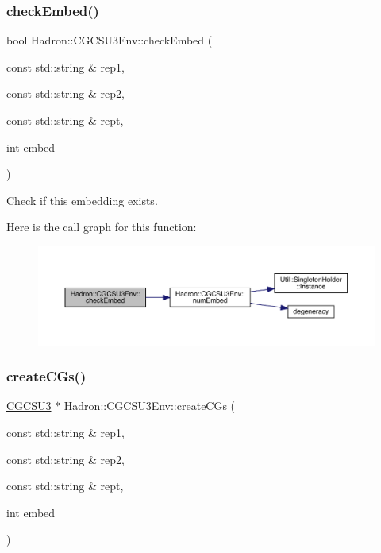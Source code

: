 \subsubsection{\texorpdfstring{checkEmbed()}{checkEmbed()}}
{\footnotesize\ttfamily bool Hadron\+::\+C\+G\+C\+S\+U3\+Env\+::check\+Embed (\begin{DoxyParamCaption}\item[{const std\+::string \&}]{rep1,  }\item[{const std\+::string \&}]{rep2,  }\item[{const std\+::string \&}]{rept,  }\item[{int}]{embed }\end{DoxyParamCaption})}



Check if this embedding exists. 

Here is the call graph for this function\+:
\nopagebreak
\begin{figure}[H]
\begin{center}
\leavevmode
\includegraphics[width=350pt]{d4/d47/namespaceHadron_1_1CGCSU3Env_a27b5d0906a9a8d201a8479db853e5ca5_cgraph}
\end{center}
\end{figure}
\mbox{\label{namespaceHadron_1_1CGCSU3Env_aa351bf5350216c70336911a96182d035}} 
\subsubsection{\texorpdfstring{createCGs()}{createCGs()}}
{\footnotesize\ttfamily \mbox{\hyperlink{classHadron_1_1CGCSU3}{C\+G\+C\+S\+U3}} $\ast$ Hadron\+::\+C\+G\+C\+S\+U3\+Env\+::create\+C\+Gs (\begin{DoxyParamCaption}\item[{const std\+::string \&}]{rep1,  }\item[{const std\+::string \&}]{rep2,  }\item[{const std\+::string \&}]{rept,  }\item[{int}]{embed }\end{DoxyParamCaption})}



